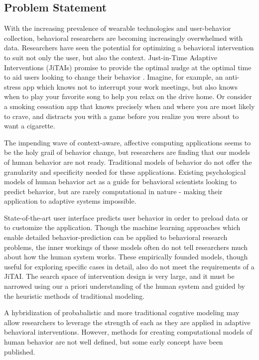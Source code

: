 \documentclass[conference]{IEEEtran}
\begin{document}
\subsection{Problem Statement}
With the increasing prevalence of wearable technologies and user-behavior collection, behavioral researchers are becoming increasingly overwhelmed with data.
Researchers have seen the potential for optimizing a behavioral intervention to suit not only the user, but also the context. 
Just-in-Time Adaptive Interventions (JiTAIs) promise to provide the optimal nudge at the optimal time to aid users looking to change their behavior \cite{nahum2014}.
Imagine, for example, an anti-stress app which knows not to interrupt your work meetings, but also knows when to play your favorite song to help you relax on the drive home.
Or consider a smoking cessation app that knows precisely when and where you are most likely to crave, and distracts you with a game before you realize you were about to want a cigarette.

The impending wave of context-aware\cite{schilit1994}, affective computing\cite{picard2000affective} applications seems to be the holy grail of behavior change, but researchers are finding that our models of human behavior are not ready.
Traditional models of behavior do not offer the granularity and specificity needed for these applications\cite{riley2011health}.
Existing psychological models of human behavior act as a guide for behavioral scientists looking to predict behavior, but are rarely computational in nature - making their application to adaptive systems impossible.

State-of-the-art user interface predicts user behavior in order to preload data or to customize the application.
Though the machine learning approaches which enable detailed behavior-prediction can be applied to behavioral research problems, the inner workings of these models often do not tell researchers much about how the human system works. 
These empirically founded models, though useful for exploring specific cases in detail, also do not meet the requirements of a JiTAI.
The search space of intervention design is very large, and it must be narrowed using our a priori understanding of the human system and guided by the heuristic methods of traditional modeling.

A hybridization of probabalistic and more traditional cogntive modeling may allow researchers to leverage the strength of each as they are applied in adaptive behavioral interventions.
However, methods for creating computational models of human behavior are not well defined, but some early concept have been published.
\end{document}
